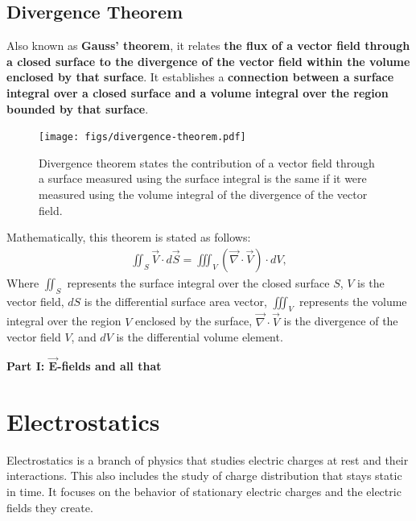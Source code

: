 \documentclass[12pt,b4paper]{article}
\begin{document}
\subsection*{Divergence Theorem}
\thispagestyle{empty}
Also known as \textbf{Gauss' theorem}, it relates \textbf{the flux of a vector field through a closed surface to the divergence of the vector field within the volume enclosed by that surface}. It establishes a \textbf{connection between a surface integral over a closed surface and a volume integral over the region bounded by that surface}.
\begin{figure}[H]
    \centering
    \texttt{[image: figs/divergence-theorem.pdf]}
    \caption{Divergence theorem states the contribution of a vector field through a surface measured using the surface integral is the same if it were measured using the volume integral of the divergence of the vector field.}
    \label{fig:divergence-theorem}
\end{figure}
Mathematically, this theorem is stated as follows:
\begin{align}
    \iint_S \vec{V}\cdot d\vec{S}=\iiint_V (\Vec{\nabla}\cdot\vec{V})\cdot dV,
\end{align}
Where $\displaystyle\iint_S$ represents the surface integral over the closed surface $S$, $V$ is the vector field, $dS$ is the differential surface area vector, $\displaystyle\iiint_V$ represents the volume integral over the region $V$ enclosed by the surface, $\displaystyle\Vec{\nabla}\cdot\vec{V}$ is the divergence of the vector field $V$, and $dV$ is the differential volume element.
\thispagestyle{empty}
\clearpage
\bigskip \
\vspace{10cm}
\vskip 20pt
\begin{center}
    \thispagestyle{empty}
    \huge{\selectfont \bf \sffamily Part I: $\boldsymbol{\vec{E}}$-fields and all that}
\end{center}
\vfill
\clearpage
\section{Electrostatics}
Electrostatics is a branch of physics that studies electric charges at rest and their interactions. This also includes the study of charge distribution that stays static in time. It focuses on the behavior of stationary electric charges and the electric fields they create.
\thispagestyle{empty}
\end{document}
